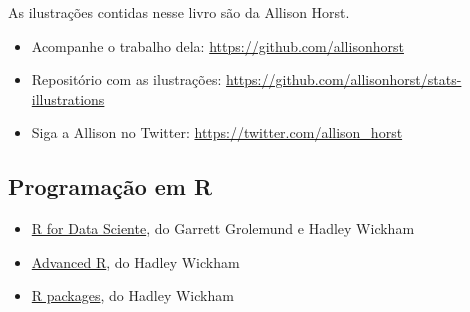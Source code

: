 \documentclass[
]{book}
\begin{document}
As ilustrações contidas nesse livro são da Allison Horst.

\begin{itemize}
\item
  Acompanhe o trabalho dela: \url{https://github.com/allisonhorst}
\item
  Repositório com as ilustrações: \url{https://github.com/allisonhorst/stats-illustrations}
\item
  Siga a Allison no Twitter: \url{https://twitter.com/allison_horst}
\end{itemize}

\hypertarget{programauxe7uxe3o-em-r}{%
\subsection*{Programação em R}\label{programauxe7uxe3o-em-r}}

\begin{itemize}
\item
  \href{https://r4ds.had.co.nz/}{R for Data Sciente}, do Garrett Grolemund e Hadley Wickham
\item
  \href{https://adv-r.hadley.nz/}{Advanced R}, do Hadley Wickham
\item
  \href{http://r-pkgs.had.co.nz/intro.html}{R packages}, do Hadley Wickham
\end{itemize}
\end{document}
